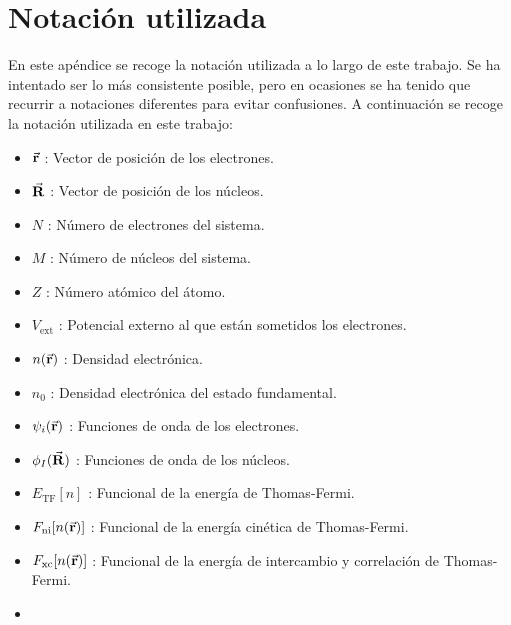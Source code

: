 \chapter*{Notación utilizada}


En este apéndice se recoge la notación utilizada a lo largo de este trabajo. Se ha intentado ser lo más consistente posible, pero en ocasiones se ha tenido que recurrir a notaciones diferentes para evitar confusiones. A continuación se recoge la notación utilizada en este trabajo:

\begin{itemize}
    \item $\va{r}$ : Vector de posición de los electrones.
    \item $\va{R}$ : Vector de posición de los núcleos.
    \item $N$ : Número de electrones del sistema.
    \item $M$ : Número de núcleos del sistema.
    \item $Z$ : Número atómico del átomo.
    \item $V_{\text{ext}}$ : Potencial externo al que están sometidos los electrones.
    \item $n(\va{r})$ : Densidad electrónica.
    \item $n_0$ : Densidad electrónica del estado fundamental.
    \item $\psi_i(\va{r})$ : Funciones de onda de los electrones.
    \item $\phi_I(\va{R})$ : Funciones de onda de los núcleos.
    \item $E_{\text{TF}}[n]$ : Funcional de la energía de Thomas-Fermi.
    \item $F_{\text{ni}}[n(\va{r})]$ : Funcional de la energía cinética de Thomas-Fermi.
    \item $F_{\text{xc}}[n(\va{r})]$ : Funcional de la energía de intercambio y correlación de Thomas-Fermi.
    \item 
\end{itemize}